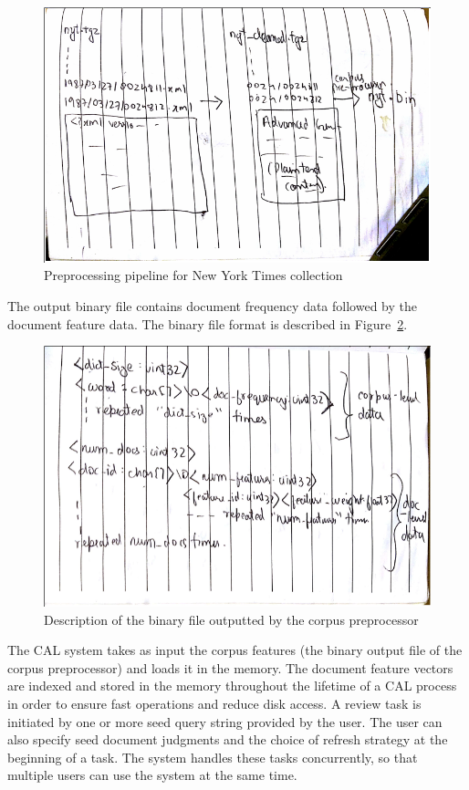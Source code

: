 \begin{figure}[h]
\includegraphics[width=\textwidth]{tmp_pictures/preprocessing_pipeline.png}
\caption{Preprocessing pipeline for New York Times collection}
\label{fig:preprocessing}
\end{figure}

The output binary file contains document frequency data followed by the document
feature data. The binary file format is described in
Figure~\ref{fig:binary_format}.

\begin{figure}[h]
\includegraphics[width=\textwidth]{tmp_pictures/binary.png}
\caption{Description of the binary file outputted by the corpus preprocessor}
\label{fig:binary_format}
\end{figure}

The CAL system takes as input the corpus features (the binary output file of the
corpus preprocessor) and loads it in the memory. The document feature vectors
are indexed and stored in the memory throughout the lifetime of a CAL process in order to
ensure fast operations and reduce disk access. A review task is initiated by one
or more seed query string provided by the user. The user can also specify seed
document judgments and the choice of refresh strategy at the beginning of a
task. The system handles these tasks concurrently, so that multiple users can
use the system at the same time.

